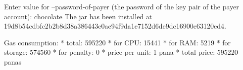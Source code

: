 \begin{shellbox}\begin{ttlst}
Enter value for --password-of-payer (the password of the key pair of the payer account): chocolate
The jar has been installed at 19d8b54cdbfc2b2b8d38a386443c0ac94f9da1e7152d6de9dc16900e63120ed4.

Gas consumption:
 * total: 595220
   * for CPU: 15441
   * for RAM: 5219
   * for storage: 574560
   * for penalty: 0
 * price per unit: 1 pana
 * total price: 595220 panas
\end{ttlst}\end{shellbox}

